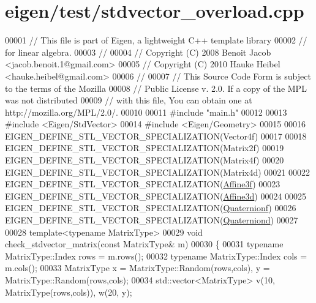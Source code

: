 \hypertarget{eigen_2test_2stdvector__overload_8cpp_source}{}\section{eigen/test/stdvector\+\_\+overload.cpp}
\label{eigen_2test_2stdvector__overload_8cpp_source}

\begin{DoxyCode}
00001 \textcolor{comment}{// This file is part of Eigen, a lightweight C++ template library}
00002 \textcolor{comment}{// for linear algebra.}
00003 \textcolor{comment}{//}
00004 \textcolor{comment}{// Copyright (C) 2008 Benoit Jacob <jacob.benoit.1@gmail.com>}
00005 \textcolor{comment}{// Copyright (C) 2010 Hauke Heibel <hauke.heibel@gmail.com>}
00006 \textcolor{comment}{//}
00007 \textcolor{comment}{// This Source Code Form is subject to the terms of the Mozilla}
00008 \textcolor{comment}{// Public License v. 2.0. If a copy of the MPL was not distributed}
00009 \textcolor{comment}{// with this file, You can obtain one at http://mozilla.org/MPL/2.0/.}
00010 
00011 \textcolor{preprocessor}{#include "main.h"}
00012 
00013 \textcolor{preprocessor}{#include <Eigen/StdVector>}
00014 \textcolor{preprocessor}{#include <Eigen/Geometry>}
00015 
00016 EIGEN\_DEFINE\_STL\_VECTOR\_SPECIALIZATION(Vector4f)
00017 
00018 EIGEN\_DEFINE\_STL\_VECTOR\_SPECIALIZATION(Matrix2f)
00019 EIGEN\_DEFINE\_STL\_VECTOR\_SPECIALIZATION(Matrix4f)
00020 EIGEN\_DEFINE\_STL\_VECTOR\_SPECIALIZATION(Matrix4d)
00021 
00022 EIGEN\_DEFINE\_STL\_VECTOR\_SPECIALIZATION(\hyperlink{group___geometry___module_class_eigen_1_1_transform}{Affine3f})
00023 EIGEN\_DEFINE\_STL\_VECTOR\_SPECIALIZATION(\hyperlink{group___geometry___module_class_eigen_1_1_transform}{Affine3d})
00024 
00025 EIGEN\_DEFINE\_STL\_VECTOR\_SPECIALIZATION(\hyperlink{group___geometry___module_class_eigen_1_1_quaternion}{Quaternionf})
00026 EIGEN\_DEFINE\_STL\_VECTOR\_SPECIALIZATION(\hyperlink{group___geometry___module_class_eigen_1_1_quaternion}{Quaterniond})
00027 
00028 \textcolor{keyword}{template}<\textcolor{keyword}{typename} MatrixType>
00029 \textcolor{keywordtype}{void} check\_stdvector\_matrix(\textcolor{keyword}{const} MatrixType& m)
00030 \{
00031   \textcolor{keyword}{typename} MatrixType::Index rows = m.rows();
00032   \textcolor{keyword}{typename} MatrixType::Index cols = m.cols();
00033   MatrixType x = MatrixType::Random(rows,cols), y = MatrixType::Random(rows,cols);
00034   std::vector<MatrixType> v(10, MatrixType(rows,cols)), w(20, y);

\end{DoxyCode}
